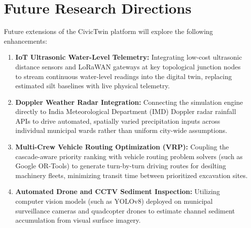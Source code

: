 \section{Future Research Directions}
Future extensions of the CivicTwin platform will explore the following enhancements:
\begin{enumerate}
    \item \textbf{IoT Ultrasonic Water-Level Telemetry:} Integrating low-cost ultrasonic distance sensors and LoRaWAN gateways at key topological junction nodes to stream continuous water-level readings into the digital twin, replacing estimated silt baselines with live physical telemetry.
    \item \textbf{Doppler Weather Radar Integration:} Connecting the simulation engine directly to India Meteorological Department (IMD) Doppler radar rainfall APIs to drive automated, spatially varied precipitation inputs across individual municipal wards rather than uniform city-wide assumptions.
    \item \textbf{Multi-Crew Vehicle Routing Optimization (VRP):} Coupling the cascade-aware priority ranking with vehicle routing problem solvers (such as Google OR-Tools) to generate turn-by-turn driving routes for desilting machinery fleets, minimizing transit time between prioritized excavation sites.
    \item \textbf{Automated Drone and CCTV Sediment Inspection:} Utilizing computer vision models (such as YOLOv8) deployed on municipal surveillance cameras and quadcopter drones to estimate channel sediment accumulation from visual surface imagery.
\end{enumerate}
